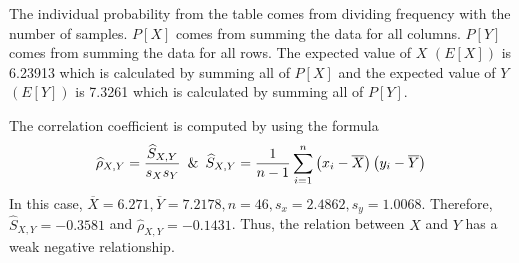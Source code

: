 \noindent The individual probability from the table comes from dividing frequency with the number of samples. $P[X]$ comes from summing the data for all columns. $P[Y]$ comes from summing the data for all rows. The expected value of $X$ $(E[X])$ is 6.23913 which is calculated by summing all of $P[X]$ and the expected value of $Y$ $(E[Y])$ is 7.3261 which is calculated by summing all of $P[Y]$.
\begin{figure}[h!]
\end{figure}\newpage
The correlation coefficient is computed by using the formula 
\begin{displaymath}
    \widehat{\rho}_{X, Y} = \dfrac{\widehat{S}_{X, Y}}{s_Xs_Y} \enskip \& \enskip \widehat{S}_{X, Y}=\dfrac{1}{n-1}\displaystyle\sum\limits^n_{i=1}\left(x_i-\overline{X}\right)\left(y_i-\overline{Y}\right)
\end{displaymath}
In this case, \(\overline{X} = 6.271, \overline{Y} = 7.2178, n = 46, s_x = 2.4862, s_y = 1.0068\). Therefore, \(\widehat{S}_{X, Y} = -0.3581\) and \(\widehat{\rho}_{X, Y} = -0.1431\). Thus, the relation between $X$ and $Y$ has a weak negative relationship.\\
